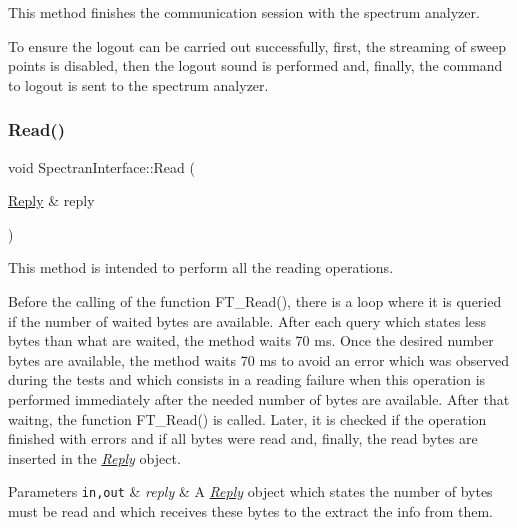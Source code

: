 This method finishes the communication session with the spectrum analyzer. 

To ensure the logout can be carried out successfully, first, the streaming of sweep points is disabled, then the logout sound is performed and, finally, the command to logout is sent to the spectrum analyzer. \mbox{\label{classSpectranInterface_a63c61d4d26c5aa335c6a20f469f3ec00}} 
\subsubsection{\texorpdfstring{Read()}{Read()}}
{\footnotesize\ttfamily void Spectran\+Interface\+::\+Read (\begin{DoxyParamCaption}\item[{\hyperlink{classReply}{Reply} \&}]{reply }\end{DoxyParamCaption})\hspace{0.3cm}{\ttfamily [inline]}}



This method is intended to perform all the reading operations. 

Before the calling of the function {\ttfamily F\+T\+\_\+\+Read()}, there is a loop where it is queried if the number of waited bytes are available. After each query which states less bytes than what are waited, the method waits 70 ms. Once the desired number bytes are available, the method waits 70 ms to avoid an error which was observed during the tests and which consists in a reading failure when this operation is performed immediately after the needed number of bytes are available. After that waitng, the function {\ttfamily F\+T\+\_\+\+Read()} is called. Later, it is checked if the operation finished with errors and if all bytes were read and, finally, the read bytes are inserted in the {\itshape \hyperlink{classReply}{Reply}} object. 
\begin{DoxyParams}[1]{Parameters}
\mbox{\tt in,out}  & {\em reply} & A {\itshape \hyperlink{classReply}{Reply}} object which states the number of bytes must be read and which receives these bytes to the extract the info from them. \\
\hline
\end{DoxyParams}
\mbox{\label{classSpectranInterface_a512218c4f1589c32b4fd9a0f7ad5e8cc}} 
